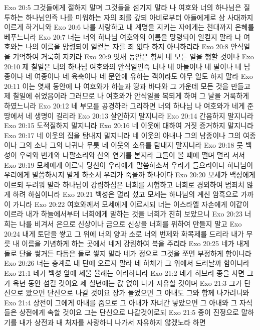 Exo 20:5  그것들에게 절하지 말며 그것들을 섬기지 말라 나 여호와 너의 하나님은 질투하는 하나님인즉 나를 미워하는 자의 죄를 갚되 아비로부터 아들에게로 삼 사대까지 이르게 하거니와
Exo 20:6  나를 사랑하고 내 계명을 지키는 자에게는 천대까지 은혜를 베푸느니라
Exo 20:7  너는 너의 하나님 여호와의 이름을 망령되이 일컫지 말라 나 여호와는 나의 이름을 망령되이 일컫는 자를 죄 없다 하지 아니하리라
Exo 20:8  안식일을 기억하여 거룩히 지키라
Exo 20:9  엿새 동안은 힘써 네 모든 일을 행할 것이나
Exo 20:10  제 칠일은 너의 하나님 여호와의 안식일인즉 너나 네 아들이나 네 딸이나 네 남종이나 네 여종이나 네 육축이나 네 문안에 유하는 객이라도 아무 일도 하지 말라
Exo 20:11  이는 엿새 동안에 나 여호와가 하늘과 땅과 바다와 그 가운데 모든 것을 만들고 제 칠일에 쉬었음이라 그러므로 나 여호와가 안식일을 복되게 하여 그 날을 거룩하게 하였느니라
Exo 20:12  네 부모를 공경하라 그리하면 너의 하나님 나 여호와가 네게 준 땅에서 네 생명이 길리라
Exo 20:13  살인하지 말지니라
Exo 20:14  간음하지 말지니라
Exo 20:15  도적질하지 말지니라
Exo 20:16  네 이웃에 대하여 거짓 증거하지 말지니라
Exo 20:17  네 이웃의 집을 탐내지 말지니라 네 이웃의 아내나 그의 남종이나 그의 여종이나 그의 소나 그의 나귀나 무릇 네 이웃의 소유를 탐내지 말지니라
Exo 20:18  뭇 백성이 우뢰와 번개와 나팔소리와 산의 연기를 본지라 그들이 볼 때에 떨며 멀리 서서
Exo 20:19  모세에게 이르되 당신이 우리에게 말씀하소서 우리가 들으리이다 하나님이 우리에게 말씀하시지 말게 하소서 우리가 죽을까 하나이다
Exo 20:20  모세가 백성에게 이르되 두려워 말라 하나님이 강림하심은 너희를 시험하고 너희로 경외하여 범죄치 않게 하려 하심이니라
Exo 20:21  백성은 멀리 섰고 모세는 하나님의 계신 암흑으로 가까이 가니라
Exo 20:22  여호와께서 모세에게 이르시되 너는 이스라엘 자손에게 이같이 이르라 내가 하늘에서부터 너희에게 말하는 것을 너희가 친히 보았으니
Exo 20:23  너희는 나를 비겨서 은으로 신상이나 금으로 신상을 너희를 위하여 만들지 말고
Exo 20:24  내게 토단을 쌓고 그 위에 너의 양과 소로 너의 번제와 화목제를 드리라 내가 무릇 내 이름을 기념하게 하는 곳에서 네게 강림하여 복을 주리라
Exo 20:25  네가 내게 돌로 단을 쌓거든 다듬은 돌로 쌓지 말라 네가 정으로 그것을 쪼면 부정하게 함이니라
Exo 20:26  너는 층계로 내 단에 오르지 말라 네 하체가 그 위에서 드러날까 함이니라
Exo 21:1  네가 백성 앞에 세울 율례는 이러하니라
Exo 21:2  네가 히브리 종을 사면 그가 육년 동안 섬길 것이요 제 칠년에는 값 없이 나가 자유할 것이며
Exo 21:3  그가 단신으로 왔으면 단신으로 나갈 것이요 장가 들었으면 그 아내도 그와 함께 나가려니와
Exo 21:4  상전이 그에게 아내를 줌으로 그 아내가 자녀간 낳았으면 그 아내와 그 자식들은 상전에게 속할 것이요 그는 단신으로 나갈것이로되
Exo 21:5  종이 진정으로 말하기를 내가 상전과 내 처자를 사랑하니 나가서 자유하지 않겠노라 하면
